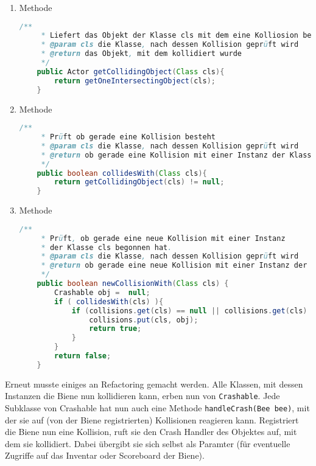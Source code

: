 \documentclass{pi1}
\begin{document}
\begin{enumerate}

\item
Methode
\begin{lstlisting}[caption={\emph{getCollidingObject(Class cls)}-Methode}, firstnumber=25, language=Java]
/**
     * Liefert das Objekt der Klasse cls mit dem eine Kolliosion besteht.
     * @param cls die Klasse, nach dessen Kollision geprüft wird
     * @return das Objekt, mit dem kollidiert wurde
     */
    public Actor getCollidingObject(Class cls){
        return getOneIntersectingObject(cls);
    }
\end{lstlisting}

\item
Methode
\begin{lstlisting}[caption={\emph{collidesWith(Class cls)}-Methode}, firstnumber=25, language=Java]
/**
     * Prüft ob gerade eine Kollision besteht
     * @param cls die Klasse, nach dessen Kollision geprüft wird
     * @return ob gerade eine Kollision mit einer Instanz der Klasse cls besteht
     */
    public boolean collidesWith(Class cls){
        return getCollidingObject(cls) != null;
    }
\end{lstlisting}

\item
Methode
\begin{lstlisting}[caption={\emph{newCollisionWith(Class cls)}-Methode}, firstnumber=25, language=Java]
/**
     * Prüft, ob gerade eine neue Kollision mit einer Instanz
     * der Klasse cls begonnen hat.
     * @param cls die Klasse, nach dessen Kollision geprüft wird
     * @return ob gerade eine neue Kollision mit einer Instanz der Klasse cls begonnen hat
     */
    public boolean newCollisionWith(Class cls) {
        Crashable obj =  null;
        if ( collidesWith(cls) ){
            if (collisions.get(cls) == null || collisions.get(cls) != obj ){
                collisions.put(cls, obj);
                return true;
            }
        } 
        return false;
    }
\end{lstlisting}

\end{enumerate}

Erneut musste einiges an Refactoring gemacht werden. Alle Klassen, mit dessen Instanzen die Biene nun kollidieren kann, erben nun von \texttt{Crashable}. Jede Subklasse von Crashable hat nun auch eine Methode \texttt{handleCrash(Bee bee)}, mit der sie auf (von der Biene registrierten) Kollisionen reagieren kann. Registriert die Biene nun eine Kollision, ruft sie den Crash Handler des Objektes auf, mit dem sie kollidiert. Dabei übergibt sie sich selbst als Paramter (für eventuelle Zugriffe auf das Inventar oder Scoreboard der Biene).
\end{document}
